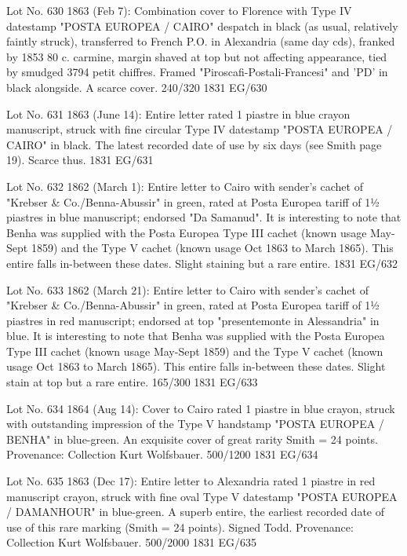 \documentclass[justified]{tufte-book}
\begin{document}
%
{Lot No. 630
1863 (Feb 7): Combination cover to Florence with Type IV datestamp "POSTA EUROPEA / CAIRO" despatch in black (as usual, relatively faintly struck), transferred to French P.O. in Alexandria (same day cds), franked by 1853 80 c. carmine, margin shaved at top but not affecting appearance, tied by smudged 3794 petit chiffres. Framed "Piroscafi-Postali-Francesi" and 'PD' in black alongside. A scarce cover.  240/320 }%
{1831}%
{EG/630}%
{}%
{}
{}%
{}

%
{Lot No. 631
1863 (June 14): Entire letter rated 1 piastre in blue crayon manuscript, struck with fine circular Type IV datestamp "POSTA EUROPEA / CAIRO" in black. The latest recorded date of use by six days (see Smith page 19). Scarce thus. }%
{1831}%
{EG/631}%
{}%
{}
{}%
{}

%
{Lot No. 632
1862 (March 1): Entire letter to Cairo with sender's cachet of "Krebser \& Co./Benna-Abussir" in green, rated at Posta Europea tariff of 1½ piastres in blue manuscript; endorsed "Da Samanud". It is interesting to note that Benha was supplied with the Posta Europea Type III cachet (known usage May-Sept 1859) and the Type V cachet (known usage Oct 1863 to March 1865). This entire falls in-between these dates. Slight staining but a rare entire. }%
{1831}%
{EG/632}%
{}%
{}
{}%
{}

%
{Lot No. 633
1862 (March 21): Entire letter to Cairo with sender's cachet of "Krebser \& Co./Benna-Abussir" in green, rated at Posta Europea tariff of 1½ piastres in red manuscript; endorsed at top "presentemonte in Alessandria" in blue. It is interesting to note that Benha was supplied with the Posta Europea Type III cachet (known usage May-Sept 1859) and the Type V cachet (known usage Oct 1863 to March 1865). This entire falls in-between these dates. Slight stain at top but a rare entire. 165/300 }%
{1831}%
{EG/633}%
{}%
{}
{}%
{}

%
{Lot No. 634
1864 (Aug 14): Cover to Cairo rated 1 piastre in blue crayon, struck with outstanding impression of the Type V handstamp "POSTA EUROPEA / BENHA" in blue-green. An exquisite cover of great rarity Smith = 24 points. Provenance: Collection Kurt Wolfsbauer. 500/1200 }%
{1831}%
{EG/634}%
{}%
{}
{}%
{}

%
{Lot No. 635
1863 (Dec 17): Entire letter to Alexandria rated 1 piastre in red manuscript crayon, struck with fine oval Type V datestamp "POSTA EUROPEA / DAMANHOUR" in blue-green. A superb entire, the earliest recorded date of use of this rare marking (Smith = 24 points). Signed Todd. Provenance: Collection Kurt Wolfsbauer. 500/2000  
}%
{1831}%
{EG/635}%
{}%
{}
{}%
{}
\end{document}
